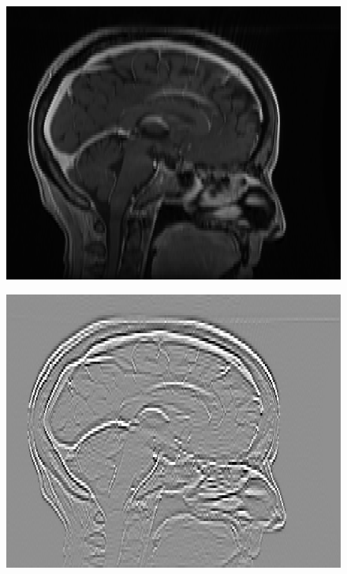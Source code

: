 \documentclass[fleqn,a4paper,oneside,openany]{book}
\begin{document}
\begin{figure}
\begin{minipage}[b]{140pt}
     \label{fig:radiomics_filter_2mm_original}
     \hspace{100pt}
   \end{minipage}
   \begin{minipage}[b]{140pt}
     \centering
     \includegraphics[trim = 0 0 0 0, clip, scale=0.38]{radiomics_filtering/filtered_image_2mm_spacing_lo.png}
     \label{fig:radiomics_filter_2mm_low_pass}
     \hspace{100pt}
   \end{minipage}
   \begin{minipage}[b]{140pt}
     \centering
     \includegraphics[trim = 0 0 0 0, clip, scale=0.38]{radiomics_filtering/filtered_image_2mm_spacing_hi.png}

\end{minipage}
\end{figure}
\end{document}
